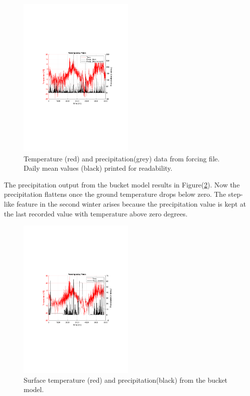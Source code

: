 \documentclass[a4paper,11pt,twocolumn]{article}
\begin{document}
\begin{figure}[h]
	\centering 
	\includegraphics[width=0.5\textwidth]{figures/forcing_finse}
	\caption{Temperature (red) and precipitation(grey) data from forcing file. Daily mean values (black) printed for readability.}
	\label{fig:forcing}
\end{figure}

The precipitation output from the bucket model results in Figure(\ref{fig:precip}). Now the precipitation flattens once the ground temperature drops below zero. The step-like feature in the second winter arises because the precipitation value is kept at the last recorded value with temperature above zero degrees.

\begin{figure}[h]
	\centering 
	\includegraphics[width=0.5\textwidth]{figures/precip}
	\caption{Surface temperature (red) and precipitation(black) from the bucket model.}
	\label{fig:precip}
\end{figure}
\end{document}
